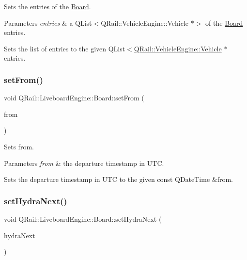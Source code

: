 Sets the entries of the \mbox{\hyperlink{classQRail_1_1LiveboardEngine_1_1Board}{Board}}. 


\begin{DoxyParams}{Parameters}
{\em entries} & a Q\+List$<$\+Q\+Rail\+::\+Vehicle\+Engine\+::\+Vehicle $\ast$$>$ of the \mbox{\hyperlink{classQRail_1_1LiveboardEngine_1_1Board}{Board}} entries.\\
\hline
\end{DoxyParams}
Sets the list of entries to the given Q\+List$<$\mbox{\hyperlink{classQRail_1_1VehicleEngine_1_1Vehicle}{Q\+Rail\+::\+Vehicle\+Engine\+::\+Vehicle}} $\ast$entries. \mbox{\label{classQRail_1_1LiveboardEngine_1_1Board_af463ed571976fe8a7c49a365b7cc2ebe}} 
\subsubsection{\texorpdfstring{setFrom()}{setFrom()}}
{\footnotesize\ttfamily void Q\+Rail\+::\+Liveboard\+Engine\+::\+Board\+::set\+From (\begin{DoxyParamCaption}\item[{const Q\+Date\+Time \&}]{from }\end{DoxyParamCaption})}



Sets from. 


\begin{DoxyParams}{Parameters}
{\em from} & the departure timestamp in U\+TC.\\
\hline
\end{DoxyParams}
Sets the departure timestamp in U\+TC to the given const Q\+Date\+Time \&from. \mbox{\label{classQRail_1_1LiveboardEngine_1_1Board_a01f417e63bf4071ffec42bab89c4a433}} 
\subsubsection{\texorpdfstring{setHydraNext()}{setHydraNext()}}
{\footnotesize\ttfamily void Q\+Rail\+::\+Liveboard\+Engine\+::\+Board\+::set\+Hydra\+Next (\begin{DoxyParamCaption}\item[{const Q\+Url \&}]{hydra\+Next }\end{DoxyParamCaption})}



